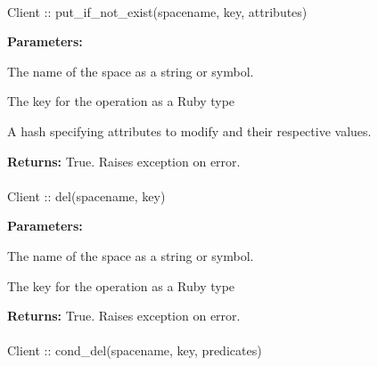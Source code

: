 \paragraph{}
\label{api:ruby:put_if_not_exist}
\begin{rubycode}
Client :: put_if_not_exist(spacename, key, attributes)
\end{rubycode}


\noindent\textbf{Parameters:}
\begin{description}[labelindent=\widthof{{\code{attributes}}},leftmargin=*,noitemsep,nolistsep,align=right]
\item[\code{spacename}] The name of the space as a string or symbol.
\item[\code{key}] The key for the operation as a Ruby type
\item[\code{attributes}] A hash specifying attributes to modify and their respective values.
\end{description}

\noindent\textbf{Returns:}
True.  Raises exception on error.

\paragraph{}
\label{api:ruby:del}
\begin{rubycode}
Client :: del(spacename, key)
\end{rubycode}


\noindent\textbf{Parameters:}
\begin{description}[labelindent=\widthof{{\code{spacename}}},leftmargin=*,noitemsep,nolistsep,align=right]
\item[\code{spacename}] The name of the space as a string or symbol.
\item[\code{key}] The key for the operation as a Ruby type
\end{description}

\noindent\textbf{Returns:}
True.  Raises exception on error.

\paragraph{}
\label{api:ruby:cond_del}
\begin{rubycode}
Client :: cond_del(spacename, key, predicates)
\end{rubycode}


